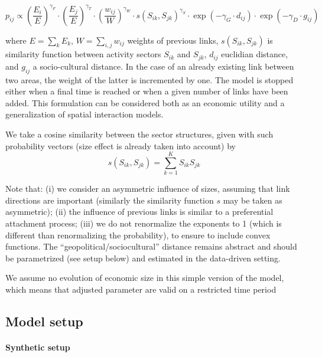 \documentclass[11pt]{article}
\begin{document}
\begin{equation}
p_{ij} \propto \left(\frac{E_{i}}{E}\right)^{\gamma_F} \cdot \left(\frac{E_{j}}{E}\right)^{\gamma_T} \cdot \left(\frac{w_{ij}}{W}\right)^{\gamma_W} \cdot s\left(S_{ik},S_{jk}\right)^{\gamma_S} \cdot \exp \left(- \gamma_G \cdot d_{ij}\right) \cdot \exp \left(- \gamma_D \cdot g_{ij}\right)
\end{equation}

where $E  =  \sum_k E_k$, $W  = \sum_{i,j} w_{ij}$ weights of previous links, $s(S_{ik},S_{jk})$ is similarity function between activity sectors $S_{ik}$ and $S_{jk}$, $d_{ij}$ euclidian distance, and $g_{ij}$ a socio-cultural distance. In the case of an already existing link between two areas, the weight of the latter is incremented by one. The model is stopped either when a final time is reached or when a given number of links have been added. This formulation can be considered both as an economic utility and a generalization of spatial interaction models.

We take a cosine similarity between the sector structures, given with such probability vectors (size effect is already taken into account) by
\begin{equation}
    s\left(S_{ik},S_{jk}\right) = \sum_{k=1}^{K} S_{ik} S_{jk}
\end{equation}

Note that: (i) we consider an asymmetric influence of sizes, assuming that link directions are important (similarly the similarity function $s$ may be taken as asymmetric); (ii) the influence of previous links is similar to a preferential attachment process; (iii) we do not renormalize the exponents to 1 (which is different than renormalizing the probability), to ensure to include convex functions. The ``geopolitical/sociocultural'' distance remains abstract and should be parametrized (see setup below) and estimated in the data-driven setting.


We assume no evolution of economic size in this simple version of the model, which means that adjusted parameter are valid on a restricted time period


\subsection{Model setup}

\paragraph{Synthetic setup}
\end{document}
